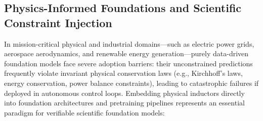 \subsection{Physics-Informed Foundations and Scientific Constraint Injection}
\label{sec:physics_informed_foundations}

In mission-critical physical and industrial domains---such as electric power grids, aerospace aerodynamics, and renewable energy generation---purely data-driven foundation models face severe adoption barriers: their unconstrained predictions frequently violate invariant physical conservation laws (e.g., Kirchhoff's laws, energy conservation, power balance constraints), leading to catastrophic failures if deployed in autonomous control loops. Embedding physical inductors directly into foundation architectures and pretraining pipelines represents an essential paradigm for verifiable scientific foundation models:
